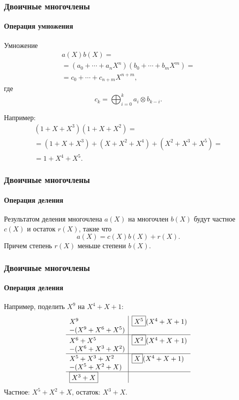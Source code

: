 \begin{frame}
    \frametitle{Двоичные многочлены}
    \framesubtitle{Операция умножения}
    
    \alert{Умножение}
    \[
        \begin{split}
            a(X)b(X)=\\
            =(a_0 + \cdots + a_nX^n)(b_0 + \cdots + b_mX^m)=\\
            =c_0 + \cdots + c_{n+m}X^{n+m},
        \end{split}
    \]
    где 
    \[
        c_k=\bigoplus_{i=0}^k a_i\otimes b_{k-i}.
    \]
    
    Например: 
    \[
    \begin{split}
        (1+X+X^3)(1+X+X^2)=\\
        =(1+X+X^3)+(X+X^2+X^4)+(X^2+X^3+X^5)=\\
        =1+X^4+X^5.
    \end{split}
    \]
\end{frame}


\begin{frame}
    \frametitle{Двоичные многочлены}
    \framesubtitle{Операция деления}
    
    Результатом \alert{деления} многочлена $a(X)$ на многочлен $b(X)$ будут \alert{частное} $c(X)$ и \alert{остаток} $r(X)$, такие что 
    \[a(X)=c(X)b(X)+r(X).\]
    Причем степень $r(X)$ меньше степени $b(X)$.
\end{frame}


\begin{frame}
    \frametitle{Двоичные многочлены}
    \framesubtitle{Операция деления}
    
    Например, поделить $X^9$ на $X^4+X+1$:
    \[
        \begin{array}[c]{l|l}
            X^9 & \fbox{$X^5$}(X^4+X+1)\\
            -(X^9+X^6+X^5)&\\
            \hline
            X^6+X^5 & \fbox{$X^2$}(X^4+X+1)\\
            -(X^6+X^3+X^2)&\\
            \hline
            X^5+X^3+X^2 & \fbox{$X$}(X^4+X+1)\\
            -(X^5+X^2+X)&\\
            \hline
            \fbox{$X^3+X$} &\\
        \end{array}
    \] 
    \alert{Частное}: $X^5+X^2+X$, \alert{остаток}: $X^3+X$.
\end{frame}


